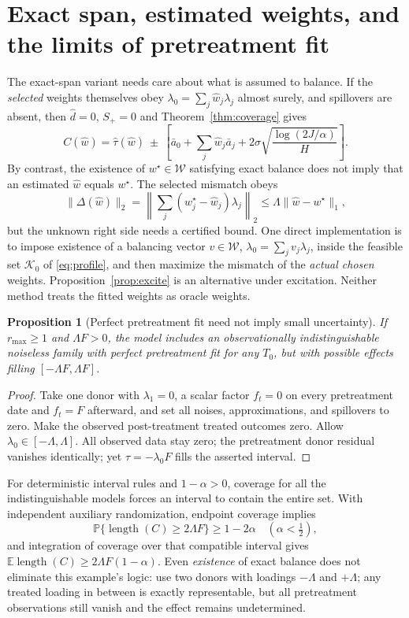 \documentclass[11pt,a4paper]{article}
\newtheorem{proposition}[theorem]{Proposition}
\newcommand{\E}{\mathbb E}
\newcommand{\Prb}{\mathbb P}
\newcommand{\W}{\mathcal W}
\newcommand{\norm}[1]{\lVert#1\rVert}
\begin{document}
\section{Exact span, estimated weights, and the limits of pretreatment fit}
The exact-span variant needs care about what is assumed to balance. If the \emph{selected} weights themselves obey
$\lambda_0=\sum_j\widehat w_j\lambda_j$ almost surely, and spillovers are absent, then $\widehat d=0$, $S_+=0$ and Theorem~\ref{thm:coverage} gives
\[
 C(\widehat w)=\widehat\tau(\widehat w)\ \pm\
 \left[\bar a_0+\sum_j\widehat w_j\bar a_j
       +2\sigma\sqrt{\frac{\log(2J/\alpha)}H}\right].
\]
By contrast, the existence of $w^\star\in\W$ satisfying exact balance does not imply that an estimated $\widehat w$ equals $w^\star$. The selected mismatch obeys
\begin{equation}\label{eq:estimated}
 \norm{\Delta(\widehat w)}_2
 =\left\|\sum_j(w_j^\star-\widehat w_j)\lambda_j\right\|_2
 \le\Lambda\norm{\widehat w-w^\star}_1,
\end{equation}
but the unknown right side needs a certified bound. One direct implementation is to impose existence of a balancing vector $v\in\W$,
$\lambda_0=\sum_jv_j\lambda_j$, inside the feasible set $\mathcal K_0$ of \eqref{eq:profile}, and then maximize the mismatch of the \emph{actual chosen} weights. Proposition~\ref{prop:excite} is an alternative under excitation. Neither method treats the fitted weights as oracle weights.

\begin{proposition}[Perfect pretreatment fit need not imply small uncertainty]\label{prop:gap}
If $r_{\max}\ge1$ and $\Lambda F>0$, the model includes an observationally indistinguishable noiseless family with perfect pretreatment fit for any $T_0$, but with possible effects filling $[-\Lambda F,\Lambda F]$.
\end{proposition}
\begin{proof}
Take one donor with $\lambda_1=0$, a scalar factor $f_t=0$ on every pretreatment date and $f_t=F$ afterward, and set all noises, approximations, and spillovers to zero. Make the observed post-treatment treated outcomes zero. Allow $\lambda_0\in[-\Lambda,\Lambda]$. All observed data stay zero; the pretreatment donor residual vanishes identically; yet $\tau=-\lambda_0F$ fills the asserted interval.
\end{proof}

For deterministic interval rules and $1-\alpha>0$, coverage for all the indistinguishable models forces an interval to contain the entire set. With independent auxiliary randomization, endpoint coverage implies
\[
 \Prb\{\operatorname{length}(C)\ge2\Lambda F\}\ge1-2\alpha
 \quad(\alpha<\tfrac12),
\]
and integration of coverage over that compatible interval gives
$\E\operatorname{length}(C)\ge2\Lambda F(1-\alpha)$.
Even \emph{existence} of exact balance does not eliminate this example's logic: use two donors with loadings $-\Lambda$ and $+\Lambda$; any treated loading in between is exactly representable, but all pretreatment observations still vanish and the effect remains undetermined.
\end{document}
